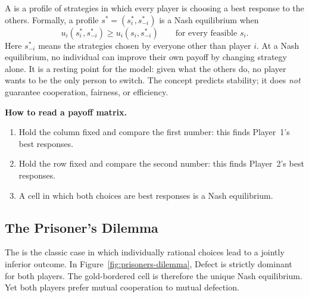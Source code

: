 A  is a profile of strategies in which every player
is choosing a best response to the others. Formally, a profile
\(s^*=(s_i^*,s_{-i}^*)\) is a Nash equilibrium when
\[
u_i(s_i^*,s_{-i}^*)\geq u_i(s_i,s_{-i}^*)
\qquad\text{for every feasible }s_i.
\]
Here \(s_{-i}^*\) means the strategies chosen by everyone other than player
\(i\). At a Nash equilibrium, no individual can improve their own payoff by
changing strategy alone. It is a resting point for the model: given what the
others do, no player wants to be the only person to switch. The concept
predicts stability; it does \emph{not} guarantee cooperation, fairness, or
efficiency.

\begin{keyidea}
\textbf{How to read a payoff matrix.}
\begin{enumerate}
  \item Hold the column fixed and compare the first number: this finds Player~1's best responses.
  \item Hold the row fixed and compare the second number: this finds Player~2's best responses.
  \item A cell in which both choices are best responses is a Nash equilibrium.
\end{enumerate}
\end{keyidea}

\subsection{The Prisoner's Dilemma}

The  is the classic case in which individually
rational choices lead to a jointly inferior outcome. In Figure~\ref{fig:prisoners-dilemma},
Defect is strictly dominant for both players. The gold-bordered cell is
therefore the unique Nash equilibrium. Yet both players prefer mutual
cooperation to mutual defection.

